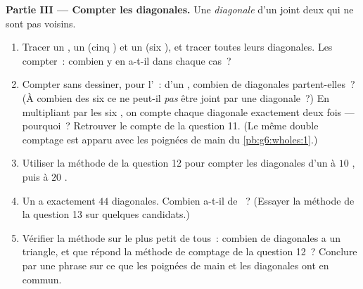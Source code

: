 \begin{problem}
\medskip
\noindent\textbf{Partie III --- Compter les diagonales.}
Une \emph{diagonale} d'un  joint deux  qui ne sont pas
voisins.
\begin{enumerate}[resume]
  \item Tracer un , un  (cinq ) et un
         (six ), et tracer toutes leurs diagonales.
        Les compter~: combien y en a-t-il dans chaque cas~?
  \item Compter sans dessiner, pour l'~: d'un ,
        combien de diagonales partent-elles~? (À combien des six
         ce  ne peut-il \emph{pas} être joint par une
        diagonale~?) En multipliant par les six , on compte
        chaque diagonale exactement deux fois --- pourquoi~?
        Retrouver le compte de la question 11. (Le même double
        comptage est apparu avec les poignées de main du
        \cref{pb:g6:wholes:1}.)
  \item Utiliser la méthode de la question 12 pour compter les
        diagonales d'un  à $10$ , puis à $20$
        .
  \item Un  a exactement $44$ diagonales. Combien a-t-il de
        ~? (Essayer la méthode de la question 13 sur
        quelques candidats.)
  \item Vérifier la méthode sur le plus petit  de tous~:
        combien de diagonales a un triangle, et que répond la
        méthode de comptage de la question 12~? Conclure par une
        phrase sur ce que les poignées de main et les diagonales ont
        en commun.
\end{enumerate}
\end{problem}
